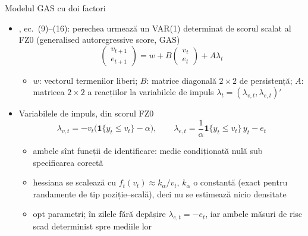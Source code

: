 \begin{frame}{Modelul GAS cu doi factori}
\itemsize{\small}
\begin{itemize}
    \item {}, ec.~(9)--(16): perechea urmează un VAR(1) determinat de scorul scalat al FZ0 (generalised autoregressive score, GAS)
    \[ \begin{pmatrix} v_{t+1} \\ e_{t+1}\end{pmatrix} = w + B\begin{pmatrix} v_t \\ e_t\end{pmatrix} + A\lambda_t \]
    \begin{itemize}
        \item $w$: vectorul termenilor liberi; $B$: matrice diagonală $2\times2$ de persistență; $A$: matricea $2\times2$ a reacțiilor la variabilele de impuls $\lambda_t = (\lambda_{v,t}, \lambda_{e,t})'$
    \end{itemize}
    \item Variabilele de impuls, din scorul FZ0
    \[ \lambda_{v,t} = -v_t\big(\mathbf 1\{y_t \le v_t\} - \alpha\big), \qquad \lambda_{e,t} = \frac{1}{\alpha}\mathbf 1\{y_t \le v_t\}\,y_t - e_t \]
    \begin{itemize}
        \item ambele sînt funcții de identificare: medie condiționată nulă sub specificarea corectă
        \item hessiana se scalează cu $f_t(v_t) \approx k_\alpha/v_t$, $k_\alpha$ o constantă (exact pentru randamente de tip poziție--scală), deci nu se estimează nicio densitate
        \item opt parametri; în zilele fără depășire $\lambda_{e,t} = -e_t$, iar ambele măsuri de risc scad determinist spre mediile lor
    \end{itemize}
\end{itemize}
\end{frame}

